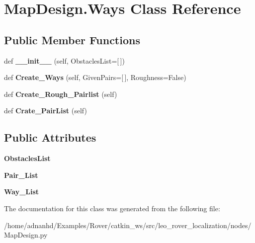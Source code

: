 \hypertarget{classMapDesign_1_1Ways}{}\section{Map\+Design.\+Ways Class Reference}
\label{classMapDesign_1_1Ways}
\subsection*{Public Member Functions}
\begin{DoxyCompactItemize}
\item 
\mbox{\label{classMapDesign_1_1Ways_a09120cb730092d5026f372277c79cdf0}} 
def {\bfseries \+\_\+\+\_\+init\+\_\+\+\_\+} (self, Obstacles\+List=\mbox{[}$\,$\mbox{]})
\item 
\mbox{\label{classMapDesign_1_1Ways_a790138a3e7f0146efe2357a435a23892}} 
def {\bfseries Create\+\_\+\+Ways} (self, Given\+Pairs=\mbox{[}$\,$\mbox{]}, Roughness=False)
\item 
\mbox{\label{classMapDesign_1_1Ways_ac2643341122e5d617f964162364d25c6}} 
def {\bfseries Create\+\_\+\+Rough\+\_\+\+Pairlist} (self)
\item 
\mbox{\label{classMapDesign_1_1Ways_a52e2c27a36a29ac5d5c72d1a9dc0a77c}} 
def {\bfseries Crate\+\_\+\+Pair\+List} (self)
\end{DoxyCompactItemize}
\subsection*{Public Attributes}
\begin{DoxyCompactItemize}
\item 
\mbox{\label{classMapDesign_1_1Ways_aff43bcec1fb2561373be3615927bcb0c}} 
{\bfseries Obstacles\+List}
\item 
\mbox{\label{classMapDesign_1_1Ways_a27a503ff093ed1a6fb2e45227c8dce74}} 
{\bfseries Pair\+\_\+\+List}
\item 
\mbox{\label{classMapDesign_1_1Ways_afdc71943cfba7d411c03cfd7d941be9c}} 
{\bfseries Way\+\_\+\+List}
\end{DoxyCompactItemize}


The documentation for this class was generated from the following file\+:\begin{DoxyCompactItemize}
\item 
/home/adnanhd/\+Examples/\+Rover/catkin\+\_\+ws/src/leo\+\_\+rover\+\_\+localization/nodes/Map\+Design.\+py\end{DoxyCompactItemize}
